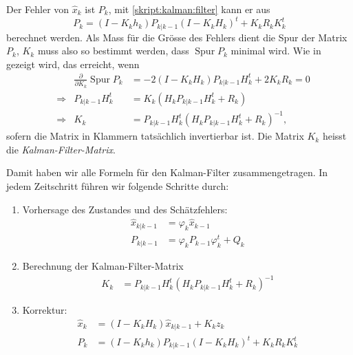 Der Fehler von $\hat{x}_k$ ist $P_k$, mit \eqref{skript:kalman:filter}
kann er aus
\begin{equation}
P_k
=
(I-K_kh_k)P_{k|k-1}(I-K_kH_k)^t + K_kR_kK_k^t
\label{skript:fehler:korrektur}
\end{equation}
berechnet werden.
Als Mass für die Grösse des Fehlers dient die Spur der Matrix $P_k$,
$K_k$ muss also so bestimmt werden, dass $\operatorname{Spur} P_k$ 
minimal wird.
Wie in \cite{skript:wrstatskript} gezeigt wird, das erreicht, wenn
\[
\begin{aligned}
&&
\frac{\partial}{\partial K_k} \operatorname{Spur}P_k
&=
-2(I-K_kH_k)P_{k|k-1}H_k^t + 2K_kR_k
=
0
\\
&\Rightarrow&
P_{k|k-1}H_k^t
&=
K_k(H_kP_{k|k-1}H_k^t+R_k)
\\
&\Rightarrow&
K_k
&=
P_{k|k-1}H_k^t
(H_kP_{k|k-1}H_k^t+R_k)^{-1},
\end{aligned}
\]
sofern die Matrix in Klammern tatsächlich invertierbar ist.
Die Matrix $K_k$ heisst die {\em Kalman-Filter-Matrix}.
%

Damit haben wir alle Formeln für den Kalman-Filter zusammengetragen.
In jedem Zeitschritt führen wir folgende Schritte durch:
\begin{enumerate}
\item
Vorhersage des Zustandes und des Schätzfehlers:
\begin{align*}
\hat{x}_{k|k-1}&= \varphi_k\hat{x}_{k-1} \\
P_{k|k-1}      &= \varphi_kP_{k-1}\varphi_k^t + Q_k
\end{align*}
\item
Berechnung der Kalman-Filter-Matrix
\begin{align*}
K_k
&=
P_{k|k-1}H_k^t
(H_kP_{k|k-1}H_k^t+R_k)^{-1}
\end{align*}
\item
Korrektur:
\begin{align*}
\hat{x}_k&= (I-K_kH_k)\hat{x}_{k|k-1} + K_kz_k \\
P_k      &= 
(I-K_kh_k)P_{k|k-1}(I-K_kH_k)^t + K_kR_kK_k^t
\end{align*}
\end{enumerate}

